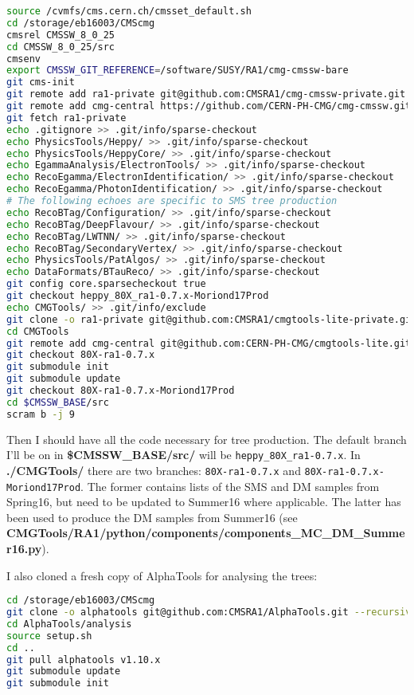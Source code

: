 \begin{lstlisting}[belowskip=-0.7cm, language=sh]
source /cvmfs/cms.cern.ch/cmsset_default.sh
cd /storage/eb16003/CMScmg
cmsrel CMSSW_8_0_25
cd CMSSW_8_0_25/src
cmsenv
export CMSSW_GIT_REFERENCE=/software/SUSY/RA1/cmg-cmssw-bare
git cms-init
git remote add ra1-private git@github.com:CMSRA1/cmg-cmssw-private.git
git remote add cmg-central https://github.com/CERN-PH-CMG/cmg-cmssw.git
git fetch ra1-private
echo .gitignore >> .git/info/sparse-checkout
echo PhysicsTools/Heppy/ >> .git/info/sparse-checkout
echo PhysicsTools/HeppyCore/ >> .git/info/sparse-checkout
echo EgammaAnalysis/ElectronTools/ >> .git/info/sparse-checkout
echo RecoEgamma/ElectronIdentification/ >> .git/info/sparse-checkout
echo RecoEgamma/PhotonIdentification/ >> .git/info/sparse-checkout
# The following echoes are specific to SMS tree production
echo RecoBTag/Configuration/ >> .git/info/sparse-checkout
echo RecoBTag/DeepFlavour/ >> .git/info/sparse-checkout
echo RecoBTag/LWTNN/ >> .git/info/sparse-checkout
echo RecoBTag/SecondaryVertex/ >> .git/info/sparse-checkout
echo PhysicsTools/PatAlgos/ >> .git/info/sparse-checkout
echo DataFormats/BTauReco/ >> .git/info/sparse-checkout
git config core.sparsecheckout true
git checkout heppy_80X_ra1-0.7.x-Moriond17Prod
echo CMGTools/ >> .git/info/exclude
git clone -o ra1-private git@github.com:CMSRA1/cmgtools-lite-private.git CMGTools
cd CMGTools
git remote add cmg-central git@github.com:CERN-PH-CMG/cmgtools-lite.git
git checkout 80X-ra1-0.7.x
git submodule init
git submodule update
git checkout 80X-ra1-0.7.x-Moriond17Prod
cd $CMSSW_BASE/src
scram b -j 9
\end{lstlisting}
 
Then I should have all the code necessary for tree production. The default branch I'll be on in \textbf{\$CMSSW\_BASE/src/} will be \verb!heppy_80X_ra1-0.7.x!. In \textbf{./CMGTools/} there are two branches: \verb!80X-ra1-0.7.x! and \verb!80X-ra1-0.7.x-Moriond17Prod!. The former contains lists of the SMS and DM samples from Spring16, but need to be updated to Summer16 where applicable. The latter has been used to produce the DM samples from Summer16 (see \textbf{CMGTools/RA1/python/components/components\_MC\_DM\_Summer16.py}).

I also cloned a fresh copy of AlphaTools for analysing the trees:

\begin{lstlisting}[belowskip=-0.7cm, language=sh, numbers=none]
cd /storage/eb16003/CMScmg
git clone -o alphatools git@github.com:CMSRA1/AlphaTools.git --recursive
cd AlphaTools/analysis
source setup.sh
cd ..
git pull alphatools v1.10.x
git submodule update
git submodule init
\end{lstlisting}

